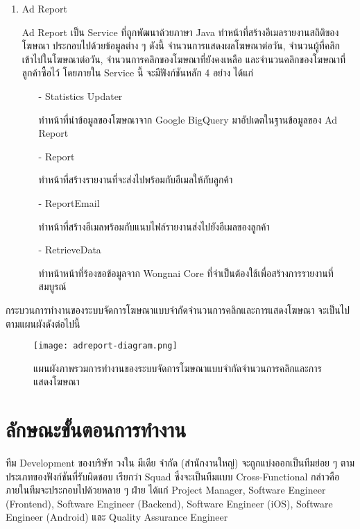 \begin{enumerate}
	\item Ad Report
	
	Ad Report เป็น Service ที่ถูกพัฒนาด้วยภาษา Java ทำหน้าที่สร้างอีเมลรายงานสถิติของโฆษณา ประกอบไปด้วยข้อมูลต่าง ๆ ดังนี้ จำนวนการแสดงผลโฆษณาต่อวัน, จำนวนผู้ที่คลิกเข้าไปในโฆษณาต่อวัน, จำนวนการคลิกของโฆษณาที่ยังคงเหลือ และจำนวนคลิกของโฆษณาที่ลูกค้าซื้อไว้ โดยภายใน Service นี้ จะมีฟังก์ชันหลัก 4 อย่าง ได้แก่
	\begin{itemize}
		\item[-] Statistics Updater
		
		ทำหน้าที่นำข้อมูลของโฆษณาจาก Google BigQuery มาอัปเดตในฐานข้อมูลของ Ad Report
		\item[-] Report
		
		ทำหน้าที่สร้างรายงานที่จะส่งไปพร้อมกับอีเมลให้กับลูกค้า
		\item[-] ReportEmail
		
		ทำหน้าที่สร้างอีเมลพร้อมกับแนบไฟล์รายงานส่งไปยังอีเมลของลูกค้า
		\item[-] RetrieveData
		
		ทำหน้าหน้าที่ร้องขอข้อมูลจาก Wongnai Core ที่จำเป็นต้องใช้เพื่อสร้างการรายงานที่สมบูรณ์
	\end{itemize}
\end{enumerate}

กระบวนการทำงานของระบบจัดการโฆษณาแบบจำกัดจำนวนการคลิกและการแสดงโฆษณา จะเป็นไปตามแผนผังดังต่อไปนี้

\begin{figure}[!h]
	\centering
	\texttt{[image: adreport-diagram.png]}  
	\caption{แผนผังภาพรวมการทำงานของระบบจัดการโฆษณาแบบจำกัดจำนวนการคลิกและการแสดงโฆษณา}
	\label{Fig:adreport-diagram}
\end{figure}

\section{ลักษณะขั้นตอนการทำงาน}
ทีม Development ของบริษัท วงใน มีเดีย จำกัด (สำนักงานใหญ่) จะถูกแบ่งออกเป็นทีมย่อย ๆ ตามประเภทของฟังก์ชันที่รับผิดชอบ เรียกว่า Squad ซึ่งจะเป็นทีมแบบ Cross-Functional กล่าวคือ ภายในทีมจะประกอบไปด้วยหลาย ๆ ฝ่าย ได้แก่ Project Manager, Software Engineer (Frontend), Software Engineer (Backend), Software Engineer (iOS), Software Engineer (Android) และ Quality Assurance Engineer

